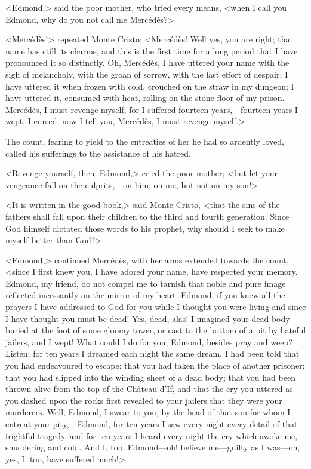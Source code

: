 <Edmond,> said the poor mother, who tried every means, <when I call you Edmond, why do you not call me Mercédès?> 

 <Mercédès!> repeated Monte Cristo; <Mercédès! Well yes, you are right; that name has still its charms, and this is the first time for a long period that I have pronounced it so distinctly. Oh, Mercédès, I have uttered your name with the sigh of melancholy, with the groan of sorrow, with the last effort of despair; I have uttered it when frozen with cold, crouched on the straw in my dungeon; I have uttered it, consumed with heat, rolling on the stone floor of my prison. Mercédès, I must revenge myself, for I suffered fourteen years,—fourteen years I wept, I cursed; now I tell you, Mercédès, I must revenge myself.> 

 The count, fearing to yield to the entreaties of her he had so ardently loved, called his sufferings to the assistance of his hatred. 

 <Revenge yourself, then, Edmond,> cried the poor mother; <but let your vengeance fall on the culprits,—on him, on me, but not on my son!> 

 <It is written in the good book,> said Monte Cristo, <that the sins of the fathers shall fall upon their children to the third and fourth generation. Since God himself dictated those words to his prophet, why should I seek to make myself better than God?> 

 <Edmond,> continued Mercédès, with her arms extended towards the count, <since I first knew you, I have adored your name, have respected your memory. Edmond, my friend, do not compel me to tarnish that noble and pure image reflected incessantly on the mirror of my heart. Edmond, if you knew all the prayers I have addressed to God for you while I thought you were living and since I have thought you must be dead! Yes, dead, alas! I imagined your dead body buried at the foot of some gloomy tower, or cast to the bottom of a pit by hateful jailers, and I wept! What could I do for you, Edmond, besides pray and weep? Listen; for ten years I dreamed each night the same dream. I had been told that you had endeavoured to escape; that you had taken the place of another prisoner; that you had slipped into the winding sheet of a dead body; that you had been thrown alive from the top of the Château d'If, and that the cry you uttered as you dashed upon the rocks first revealed to your jailers that they were your murderers. Well, Edmond, I swear to you, by the head of that son for whom I entreat your pity,—Edmond, for ten years I saw every night every detail of that frightful tragedy, and for ten years I heard every night the cry which awoke me, shuddering and cold. And I, too, Edmond—oh! believe me—guilty as I was—oh, yes, I, too, have suffered much!> 

